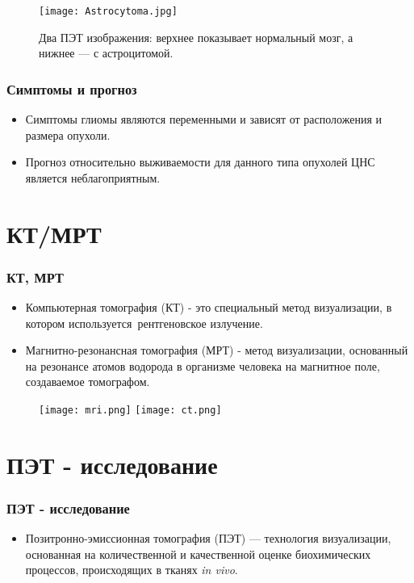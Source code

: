 \begin{frame}
  

    \begin{figure}
      \texttt{[image: Astrocytoma.jpg]}
      \caption{Два ПЭТ изображения: верхнее показывает нормальный мозг, а нижнее — с астроцитомой.}
    \end{figure}
  \end{frame}


\begin{frame}
  \frametitle{Симптомы и прогноз}
  \begin{itemize}
    \item Симптомы глиомы являются переменными и зависят от расположения и размера опухоли. 
   

  \item Прогноз относительно выживаемости для данного типа опухолей ЦНС является неблагоприятным. 
  
  \end{itemize}
\end{frame}


\section{КТ/МРТ}
\begin{frame}
    \frametitle{КТ, МРТ}
    \begin{itemize}
        \item Компьютерная томография (КТ) - это специальный метод визуализации, в котором используется рентгеновское излучение. 
        \item Магнитно-резонансная томография (МРТ) - метод визуализации, основанный на резонансе атомов водорода в организме человека на магнитное поле, 
        создаваемое томографом.
    \end{itemize}
    \begin{figure}[htbp]
        \texttt{[image: mri.png]}
        \hfill
        \texttt{[image: ct.png]}
    \end{figure}
\end{frame}


\section{ПЭТ - исследование}
\begin{frame}
    \frametitle{ПЭТ - исследование}
    \begin{itemize}
        \item Позитронно-эмиссионная томография (ПЭТ) — технология 
        визуализации, основанная на количественной и качественной 
        оценке биохимических процессов, происходящих в тканях \textit{in vivo}.
    \end{itemize}
\end{frame}
